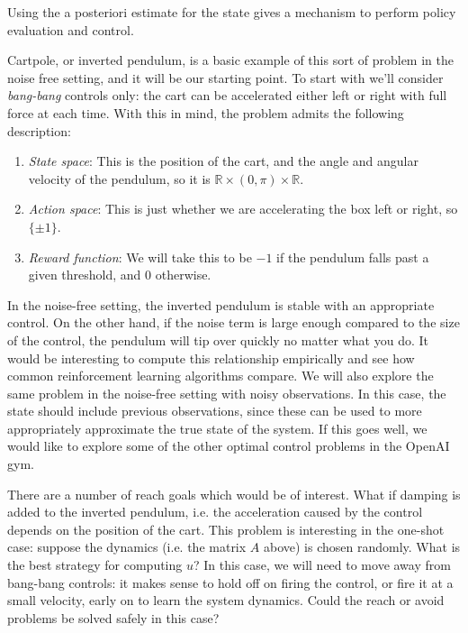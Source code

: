 \documentclass{article}
\begin{document}
Using the a posteriori estimate for the state gives a mechanism to perform policy evaluation and control. 




Cartpole, or inverted pendulum, is a basic example of this sort of problem in the noise free setting, and it will be our starting point. To start with we'll consider {\em bang-bang} controls only: the cart can be accelerated either left or right with full force at each time. With this in mind, the problem admits the following description:
\begin{enumerate}
    \item []{\em State space}: This is the position of the cart, and the angle and angular velocity of the pendulum, so it is $\mathbb R \times (0,\pi) \times \mathbb R$.
    \item []{\em Action space}: This is just whether we are accelerating the box left or right, so $\{\pm 1\}$.
    \item []{\em Reward function}: We will take this to be $-1$ if the pendulum falls past a given threshold, and $0$ otherwise.
\end{enumerate}

In the noise-free setting, the inverted pendulum is stable with an appropriate control. On the other hand, if the noise term is large enough compared to the size of the control, the pendulum will tip over quickly no matter what you do. It would be interesting to compute this relationship empirically and see how common reinforcement learning algorithms compare.
We will also explore the same problem in the noise-free setting with noisy observations. In this case, the state should include previous observations, since these can be used to more appropriately approximate the true state of the system.
If this goes well, we would like to explore some of the other optimal control problems in the OpenAI gym.

There are a number of reach goals which would be of interest. What if damping is added to the inverted pendulum, i.e. the acceleration caused by the control depends on the position of the cart. This problem is interesting in the one-shot case: suppose the dynamics (i.e. the matrix $A$ above) is chosen randomly. What is the best strategy for computing $u$? In this case, we will need to move away from bang-bang controls: it makes sense to hold off on firing the control, or fire it at a small velocity, early on to learn the system dynamics. Could the reach or avoid problems be solved safely in this case?
\end{document}
